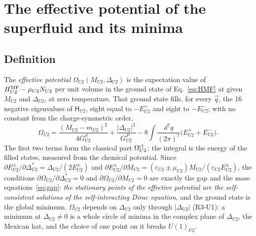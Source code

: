 \section{The effective potential of the superfluid and its minima}
\label{sec:potential}

\subsection{Definition}

The \emph{effective potential} $\Omega_{U2}(M_{U2},\Delta_{U2})$ is the expectation value of
$H^{\rm MF}_{U2}-\mu_{U2}N_{U2}$ per unit volume in the ground state of Eq.~\eqref{eq:HMF} at given
$M_{U2}$ and $\Delta_{U2}$, at zero temperature. That ground state fills, for every $\vec q$, the 16
negative eigenvalues of $\mathsf H_{U2}$, eight equal to $-E^+_{U2}$ and eight to $-E^-_{U2}$; with
no constant from the charge-symmetric order,
\begin{equation}
\Omega_{U2}=\frac{(M_{U2}-m_{U2})^2}{4G^S_{U2}}+\frac{|\Delta_{U2}|^2}{G^P_{U2}}
-8\int\frac{d^7q}{(2\pi)^7}\big(E^+_{U2}+E^-_{U2}\big).
\label{eq:Omega}
\end{equation}
The first two terms form the classical part $\Omega^{\rm cl}_{U2}$; the integral is the energy of
the filled states, measured from the chemical potential. Since
$\partial E^\pm_{U2}/\partial\Delta^*_{U2}=\Delta_{U2}/(2E^\pm_{U2})$ and
$\partial E^\pm_{U2}/\partial M_{U2}=(\varepsilon_{U2}\pm\mu_{U2})M_{U2}/(\varepsilon_{U2}E^\pm_{U2})$, the
conditions $\partial\Omega_{U2}/\partial\Delta^*_{U2}=0$ and $\partial\Omega_{U2}/\partial
M_{U2}=0$ are exactly the gap and the mass equations~\eqref{eq:gap}: \emph{the stationary points of
the effective potential are the self-consistent solutions of the self-interacting Dirac equation},
and the ground state is the global minimum. $\Omega_{U2}$ depends on $\Delta_{U2}$ only through
$|\Delta_{U2}|$ (R3-U1): a minimum at $\Delta_{U2}\neq0$ is a whole circle of minima in the complex
plane of $\Delta_{U2}$, the Mexican hat, and the choice of one point on it breaks $U(1)_{U2}$.

